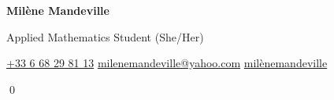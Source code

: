 \documentclass[10pt]{article}
\begin{document}
\pagestyle{empty}
\begin{center}
    {\textbf{\huge Milène Mandeville}}
    
    \bigbreak
    \Large{Applied Mathematics Student} \normalsize{(She/Her)}\vspace{3mm}
\end{center}
\begin{center}
     \href{https://wa.me/33668298113}{+33 6 68 29 81 13} \hspace{1cm}
     \href{mailto:milenemandeville@yahoo.com}{milenemandeville@yahoo.com} \hspace{1cm}
     \href{https://www.linkedin.com/in/milènemandeville/}{milènemandeville}\vspace{3mm}
\end{center}

\begin{minipage}[t]{0.45\linewidth}





\end{minipage}\hfill













\qed
\end{document}
